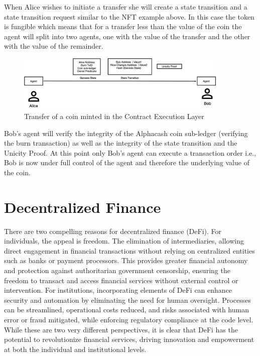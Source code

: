 \documentclass{article}
\begin{document}
When Alice wishes to initiate a transfer she will create a state transition and a state transition request similar to the NFT example above. In this case the token is fungible which means that for a transfer less than the value of the coin the agent will split into two agents, one with the value of the transfer and the other with the value of the remainder.

\begin{figure}[H]
    \centering
    \includegraphics[width=0.9\textwidth]{Alice-Transfer.png}
    \caption{Transfer of a coin minted in the Contract Execution Layer}
    \label{fig:Alice Transfer}
\end{figure}


\vspace{2mm}

Bob's agent will verify the integrity of the Alphacash coin sub-ledger (verifying the burn transaction) as well as the integrity of the state transition and the Unicity Proof. At this point only Bob's agent can execute a transaction order i.e., Bob is now under full control of the agent and therefore the underlying value of the coin.

\vspace{2mm}


\section{Decentralized Finance}
There are two compelling reasons for decentralized finance (DeFi). For individuals, the appeal is freedom. The elimination of intermediaries, allowing direct engagement in financial transactions without relying on centralized entities such as banks or payment processors. This provides greater financial autonomy and protection against authoritarian government censorship, ensuring the freedom to transact and access financial services without external control or intervention. For institutions, incorporating elements of DeFi can enhance security and automation by eliminating the need for human oversight. Processes can be streamlined, operational costs reduced, and risks associated with human error or fraud mitigated, while enforcing regulatory compliance at the code level. While these are two very different perspectives, it is clear that DeFi has the potential to revolutionize financial services, driving innovation and empowerment at both the individual and institutional levels.
\end{document}
